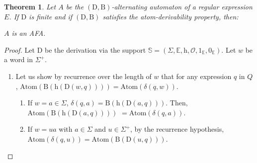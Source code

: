 \documentclass{article}
\newtheorem{theorem}{Theorem}
\begin{document}
   
  \begin{theorem}\label{thm afa}
    Let $A$ be the $(\mathrm{D},\mathrm{B})$-alternating automaton of a regular expression $E$. If $\mathrm{D}$ is finite and if $(\mathrm{D},\mathrm{B})$ satisfies the atom-derivability property, then:
    
    \centerline{
      $A$ is an AFA.
    }
  \end{theorem}
  \begin{proof}
    Let $\mathrm{D}$ be the derivation via the support $\mathbb{S}=(\Sigma,\mathbb{E},\mathrm{h},\mathcal{O},1_{\mathbb{E}},0_{\mathbb{E}})$. Let $w$ be a word in $\Sigma^+$.
    
    \begin{enumerate}
    
    \item  Let us show by recurrence over the length of $w$ that for any expression $q$ in $Q$, $\mathrm{Atom}(\mathrm{B}(\mathrm{h}(\mathrm{D}(w,q))))=\mathrm{Atom}(\delta(q,w))$.
  
  \begin{enumerate}
        
      \item If $w=a\in\Sigma$, $\delta(q,a)=\mathrm{B}(\mathrm{h}(\mathrm{D}(a,q)))$. Then, $\mathrm{Atom}(\mathrm{B}(\mathrm{h}(\mathrm{D}(a,q))))$ $=\mathrm{Atom}(\delta(q,a))$.
      
      \item If $w=ua$ with $a\in\Sigma$ and $u\in\Sigma^+$, by the recurrence hypothesis, $\mathrm{Atom}(\delta(q,u))=\mathrm{Atom}(\mathrm{B}(\mathrm{D}(u,q)))$.
      

\end{enumerate}
\end{enumerate}
\end{proof}
\end{document}
